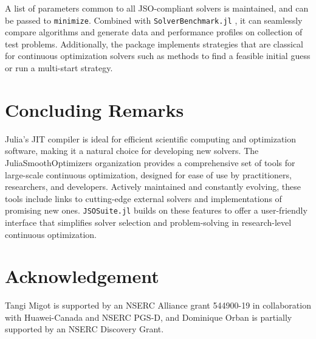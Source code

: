 \documentclass{juliacon}
\begin{document}
A list of parameters common to all JSO-compliant solvers is maintained, and can be passed to \texttt{minimize}.
%
%
Combined with \texttt{SolverBenchmark.jl} \cite{orban-siqueira-solverbenchmark-2020}, it can seamlessly compare algorithms and generate data and performance profiles on collection of test problems.
Additionally, the package implements strategies that are classical for continuous optimization solvers such as methods to find a feasible initial guess or run a multi-start strategy.

\section{Concluding Remarks}

Julia’s JIT compiler is ideal for efficient scientific computing and optimization software, making it a natural choice for developing new solvers.
%
The JuliaSmoothOptimizers organization provides a comprehensive set of tools for large-scale continuous optimization, designed for ease of use by practitioners, researchers, and developers.
%
Actively maintained and constantly evolving, these tools include links to cutting-edge external solvers and implementations of promising new ones. 
%
\texttt{JSOSuite.jl} builds on these features to offer a user-friendly interface that simplifies solver selection and problem-solving in research-level continuous optimization.

\section*{Acknowledgement}

Tangi Migot is supported by an NSERC Alliance grant 544900-19 in collaboration with Huawei-Canada and NSERC PGS-D,
and Dominique Orban is partially supported by an NSERC Discovery Grant.


\end{document}
